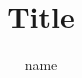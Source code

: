 \documentclass[header, margin=big]{hsrzf}
\title{Title}
\author{name}
\begin{document}
\maketitle

\blinddocument
\end{document}
